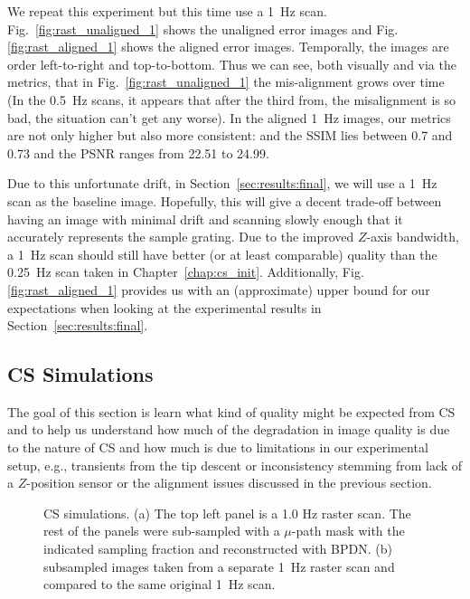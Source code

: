 We repeat this experiment but this time use a 1~Hz scan. Fig.~\ref{fig:rast_unaligned_1} shows the unaligned error images and Fig.\ref{fig:rast_aligned_1} shows the aligned error images. Temporally, the images are order left-to-right and top-to-bottom. Thus we can see, both visually and via the metrics, that in  Fig.~\ref{fig:rast_unaligned_1} the mis-alignment grows over time (In the 0.5~Hz scans, it appears that after the third from, the misalignment is so bad, the situation can't get any worse).
In the aligned 1~Hz images, our metrics are not only higher but also more consistent: and the SSIM lies between 0.7 and 0.73 and the PSNR ranges from 22.51 to 24.99.

Due to this unfortunate drift, in Section~\ref{sec:results:final}, we will use a 1~Hz scan as the baseline image. Hopefully, this will give a decent trade-off between having an image with minimal drift and scanning slowly enough that it accurately represents the sample grating. Due to the improved $Z$-axis bandwidth, a 1~Hz scan should still have better (or at least comparable) quality than the 0.25~Hz scan taken in Chapter~\ref{chap:cs_init}. Additionally, Fig.\ref{fig:rast_aligned_1} provides us with an (approximate) upper bound for our expectations when looking at the experimental results in Section~\ref{sec:results:final}.


\subsection{CS Simulations}\label{sec:cs_sim}
The goal of this section is learn what kind of quality might be expected from CS and to help us understand how much of the degradation in image quality is due to the nature of CS and how much is due to limitations in our experimental setup, e.g., transients from the tip descent or inconsistency stemming from lack of a $Z$-position sensor or the alignment issues discussed in the previous section.
\begin{figure}[ht!]
  \centering
  \begin{subfigure}{1\textwidth}
    \centering
      
  \caption{}
  \label{fig:cs_sim_1Hz}
  \end{subfigure}
  \begin{subfigure}{1\textwidth}
    \centering
    
    \caption{}
    \label{fig:cs_sim_raster_1p0_1p0}
  \end{subfigure}
  \caption{CS simulations. (a) The top left panel is a 1.0 Hz raster scan. The rest of the panels were sub-sampled with a $\mu$-path mask with the indicated sampling fraction and reconstructed with BPDN. (b) subsampled images taken from a separate 1~Hz raster scan and compared to the same original 1~Hz scan.}
  \label{fig:cs_sim_against_raster}
\end{figure}

